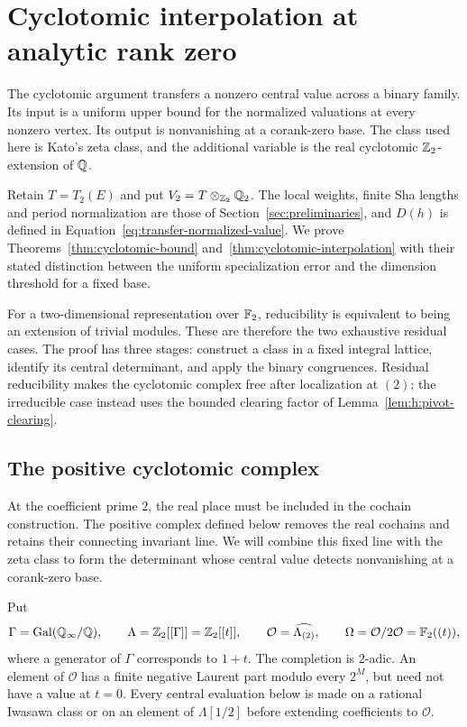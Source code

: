 \section{Cyclotomic interpolation at analytic rank zero}
\label{sec:cy:interpolation}

The cyclotomic argument transfers a nonzero central value across a binary
family. Its input is a uniform upper bound for the normalized valuations
at every nonzero vertex. Its output is nonvanishing at a corank-zero
base. The class used here is Kato's zeta class, and the additional variable
is the real cyclotomic $\mathbb Z_2$-extension of $\mathbb Q$.

Retain $T=T_2(E)$ and put $V_2=T\otimes_{\mathbb Z_2}\mathbb Q_2$.
The local weights, finite Sha lengths and period normalization are those
of Section~\ref{sec:preliminaries}, and $D(h)$ is defined in
Equation~\eqref{eq:transfer-normalized-value}. We prove
Theorems~\ref{thm:cyclotomic-bound} and~\ref{thm:cyclotomic-interpolation}
with their stated distinction between the uniform specialization error
and the dimension threshold for a fixed base.

For a two-dimensional representation over $\mathbb F_2$, reducibility is
equivalent to being an extension of trivial modules. These are therefore
the two exhaustive residual cases. The proof has three stages: construct
a class in a fixed integral lattice, identify its central determinant,
and apply the binary congruences. Residual reducibility makes the
cyclotomic complex free after localization at $(2)$; the irreducible
case instead uses the bounded clearing factor of
Lemma~\ref{lem:h:pivot-clearing}.

\subsection{The positive cyclotomic complex}

At the coefficient prime $2$, the real place must be included in the
cochain construction. The positive complex defined below removes the
real cochains and retains their connecting invariant line. We will
combine this fixed line with the zeta class to form the determinant
whose central value detects nonvanishing at a corank-zero base.

Put
\[
 \Gamma=\operatorname{Gal}(\mathbb Q_\infty/\mathbb Q),\qquad
 \Lambda=\mathbb Z_2[[\Gamma]]=\mathbb Z_2[[t]],\qquad
 \mathcal O=\widehat{\Lambda_{(2)}},\qquad
 \Omega=\mathcal O/2\mathcal O=\mathbb F_2((t)),
\]
where a generator of $\Gamma$ corresponds to $1+t$.
The completion is $2$-adic. An element of $\mathcal O$ has a finite
negative Laurent part modulo every $2^M$, but need not have a value at
$t=0$. Every central evaluation below is made on a rational Iwasawa
class or on an element of $\Lambda[1/2]$ before extending coefficients
to $\mathcal O$.

